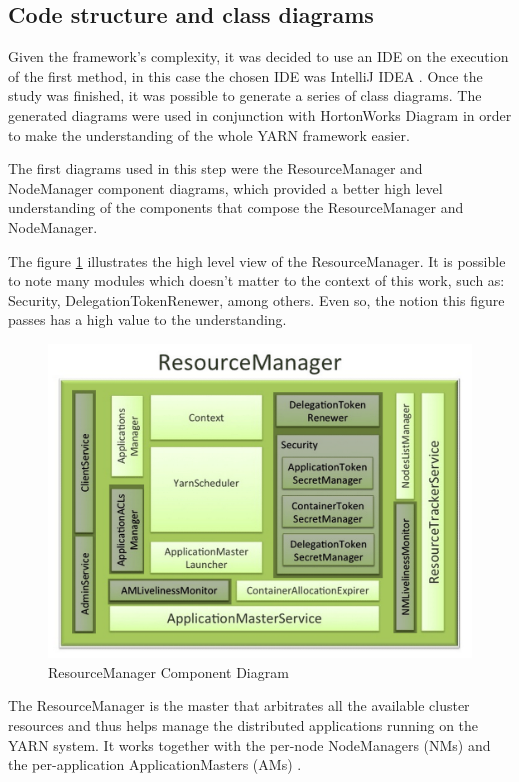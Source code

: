 \subsection{Code structure and class diagrams}

Given the framework's complexity, it was decided to use an IDE on the execution of the first method, in this case the chosen IDE was IntelliJ IDEA \cite{IDEA}. Once the study was finished, it was possible to generate a series of class diagrams. The generated diagrams were used in conjunction with HortonWorks  Diagram in order to make the understanding of the whole YARN framework easier.

The first diagrams used in this step were the ResourceManager and NodeManager component diagrams, which provided a better high level understanding of the components that compose the ResourceManager and NodeManager.

The figure \ref{fig:RMHorton} illustrates the high level view of the ResourceManager. It is possible to note many modules which doesn't matter to the context of this work, such as: Security, DelegationTokenRenewer, among others. Even so, the notion this figure passes has a high value to the understanding.

\begin{figure}[hbtn]
   \renewcommand{\figurename}{Figure}
   \centering
   \includegraphics[width=15cm]{figuras/Figura14-RMHorton.png}
   \caption{ResourceManager Component Diagram \cite{HortonRM}}
   \label{fig:RMHorton}
\end{figure}

The ResourceManager is the master that arbitrates all the available cluster resources and thus helps manage the distributed applications running on the YARN system. It works together with the per-node NodeManagers (NMs) and the per-application ApplicationMasters (AMs) \cite{HortonRM}.

